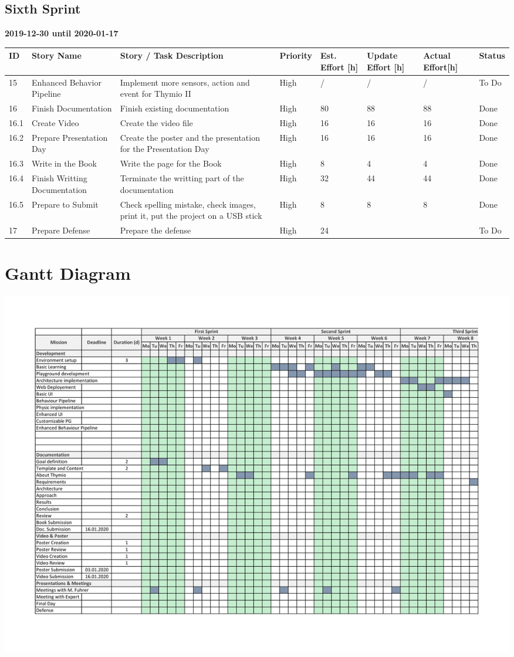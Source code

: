 \documentclass{scrreprt}
\begin{document}
\section{Sixth Sprint}
\textbf{2019-12-30 until 2020-01-17}
\begin{longtable}{p{5mm}|p{2cm}|p{4cm}|p{1cm}|p{1cm}|p{1cm}|p{1cm}|p{15mm}}
  ID                     & Story Name & Story / Task Description & Priority & Est. Effort {[}h{]} & Update Effort {[}h{]} & Actual Effort{[}h{]} & Status                \\ \hline
  15 & Enhanced Behavior Pipeline & Implement more sensors, action and event for Thymio II & High & {/} & {/} & {/} & To Do \\ 
  16 & Finish Documentation & Finish existing documentation & High & 80 & 88 & 88 & Done \\
  16.1 & Create Video & Create the video file & High & 16 & 16 & 16 & Done \\ 
  16.2 & Prepare Presentation Day & Create the poster and the presentation for the Presentation Day & High & 16 & 16 & 16 & Done \\
  16.3 & Write in the Book & Write the page for the Book & High & 8 & 4 & 4 & Done \\ 
  16.4 & Finish Writting Documentation & Terminate the writting part of the documentation & High & 32 & 44 & 44 & Done \\ 
  16.5 & Prepare to Submit & Check spelling mistake, check images, print it, put the project on a USB stick & High & 8 & 8 & 8 & Done\\ 
  17 & Prepare Defense & Prepare the defense & High & 24 &  &  & To Do \\ \hline
\end{longtable}

\chapter{Gantt Diagram}

\begin{center}
  \includegraphics[scale = 0.31, angle=-90]{./Gantt-1}
\end{center}
\end{document}
